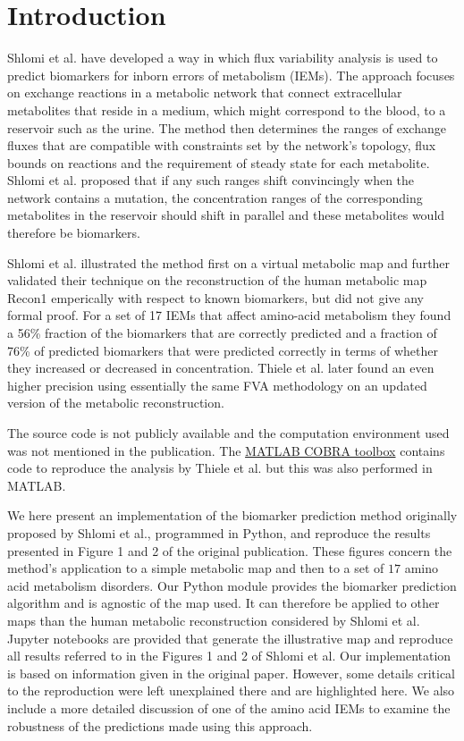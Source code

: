 \documentclass[10pt,a4paper,onecolumn]{article}
\begin{document}
\section{Introduction}\label{introduction}

Shlomi et al. \autocite{Shlomi2009} have developed a way in which flux
variability analysis \autocite{Mahadevan2003} is used to predict
biomarkers for inborn errors of metabolism (IEMs). The approach focuses
on exchange reactions in a metabolic network that connect extracellular
metabolites that reside in a medium, which might correspond to the
blood, to a reservoir such as the urine. The method then determines the
ranges of exchange fluxes that are compatible with constraints set by
the network's topology, flux bounds on reactions and the requirement of
steady state for each metabolite. Shlomi et al. proposed that if any
such ranges shift convincingly when the network contains a mutation, the
concentration ranges of the corresponding metabolites in the reservoir
should shift in parallel and these metabolites would therefore be
biomarkers.

Shlomi et al. illustrated the method first on a virtual metabolic map
and further validated their technique on the reconstruction of the human
metabolic map Recon1 \autocite{Duarte2007} emperically with respect to
known biomarkers, but did not give any formal proof. For a set of 17
IEMs that affect amino-acid metabolism they found a 56\% fraction of the
biomarkers that are correctly predicted and a fraction of 76\% of
predicted biomarkers that were predicted correctly in terms of whether
they increased or decreased in concentration. Thiele et al.
\autocite{Thiele2013} later found an even higher precision using
essentially the same FVA methodology on an updated version of the
metabolic reconstruction.

The source code is not publicly available and the computation
environment used was not mentioned in the publication. The
\href{https://github.com/opencobra/cobratoolbox}{MATLAB COBRA toolbox}
contains code to reproduce the analysis by Thiele et al. but this was
also performed in MATLAB.

We here present an implementation of the biomarker prediction method
originally proposed by Shlomi et al., programmed in Python, and
reproduce the results presented in Figure 1 and 2 of the original
publication. These figures concern the method's application to a simple
metabolic map and then to a set of \(17\) amino acid metabolism
disorders. Our Python module provides the biomarker prediction algorithm
and is agnostic of the map used. It can therefore be applied to other
maps than the human metabolic reconstruction considered by Shlomi et al.
Jupyter notebooks are provided that generate the illustrative map and
reproduce all results referred to in the Figures 1 and 2 of Shlomi et
al. Our implementation is based on information given in the original
paper. However, some details critical to the reproduction were left
unexplained there and are highlighted here. We also include a more
detailed discussion of one of the amino acid IEMs to examine the
robustness of the predictions made using this approach.
\end{document}
